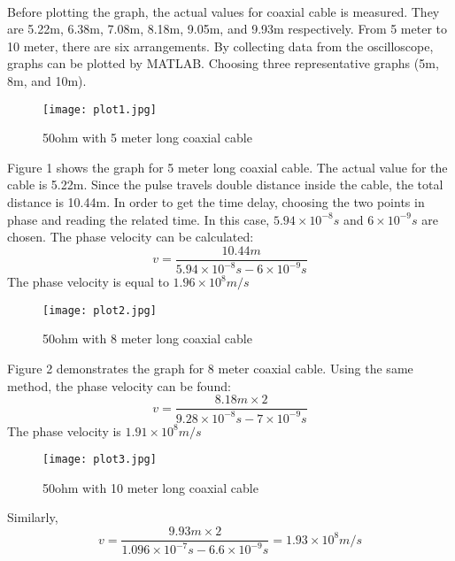 \documentclass[12pt]{article}
\begin{document}
    \paragraph{}
    Before plotting the graph, the actual values for coaxial cable is measured. They are 5.22m, 6.38m, 7.08m, 8.18m, 9.05m, and 9.93m respectively. From 5 meter to 10 meter, there are six arrangements. By collecting data from the oscilloscope, graphs can be plotted by MATLAB. Choosing three representative graphs (5m, 8m, and 10m). 
    \begin{figure}[H]
    \centering
    \texttt{[image: plot1.jpg]}
    \caption{50ohm with 5 meter long coaxial cable}
    \end{figure}
    Figure 1 shows the graph for 5 meter long coaxial cable. The actual value for the cable is 5.22m. Since the pulse travels double distance inside the cable, the total distance is 10.44m. In order to get the time delay, choosing the two points in phase and reading the related time. In this case, $5.94 \times 10^{-8}s$ and $6 \times 10^{-9}s$ are chosen. The phase velocity can be calculated:
    \begin{equation}
        v=\frac{10.44m}{5.94 \times 10^{-8}s - 6 \times 10^{-9}s}
    \end{equation}
    The phase velocity is equal to $1.96 \times 10^{8}m/s$
    \begin{figure}[H]
    \centering
    \texttt{[image: plot2.jpg]}
    \caption{50ohm with 8 meter long coaxial cable}
    \end{figure}
    Figure 2 demonstrates the graph for 8 meter coaxial cable. Using the same method, the phase velocity can be found:
     \begin{equation}
        v=\frac{8.18m\times2}{9.28 \times 10^{-8}s - 7 \times 10^{-9}s}
    \end{equation}
    The phase velocity is $1.91 \times 10^{8}m/s$
    \begin{figure}[H]
    \centering
    \texttt{[image: plot3.jpg]}
    \caption{50ohm with 10 meter long coaxial cable}
    \end{figure}
    Similarly, 
    \begin{equation}
        v=\frac{9.93m\times2}{1.096 \times 10^{-7}s - 6.6 \times 10^{-9}s}=1.93 \times 10^{8}m/s
    \end{equation}
\end{document}
